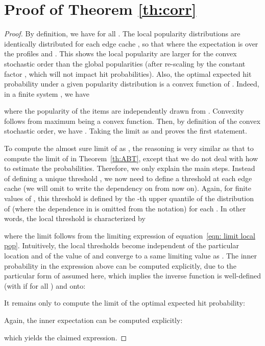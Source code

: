 \documentclass[10pt, conference, letterpaper]{IEEEtran}
\begin{document}
\section{Proof of Theorem \ref{th:corr}}\label{app:c}
\begin{proof}
By definition, we have  for all . The local popularity distributions  are identically distributed for each edge cache , so that 
where the expectation is over the profiles  and . This shows the local popularity are larger for the convex stochastic order than the global popularities (after re-scaling by the constant factor , which will not impact hit probabilities). Also, the optimal expected hit probability under a given popularity distribution  is a convex function of . Indeed, in a finite system , we have 

where the popularity of the items are independently drawn from . Convexity follows from maximum being a convex function. Then, by definition of the convex stochastic order, we have . Taking the limit as  and  proves the first statement.

To compute the almost sure limit of  as , the reasoning is very similar as that to compute the limit of  in Theorem~\ref{th:ABT}, except that we do not deal with how to estimate the probabilities. Therefore, we only explain the main steps. Instead of defining a unique threshold , we now need to define a threshold  at each edge cache (we will omit to write the dependency on  from now on). Again, for finite values of , this threshold is defined by the -th upper quantile of the distribution of  (where the dependence in  is omitted from the notation) for each . In other words, the local threshold  is characterized by 

where the limit follows from the limiting expression of equation~\eqref{eqn: limit local pop}. Intuitively, the local thresholds  become independent of the particular location  and of the value of  and converge to a same limiting value  as . The inner probability in the expression above can be computed explicitly, due to the particular form of  assumed here, which implies the inverse function  is well-defined (with  if  for all ) and onto:

It remains only to compute the limit of the optimal expected hit probability:

Again, the inner expectation can be computed explicitly:

which yields the claimed expression.
\end{proof}
\end{document}
